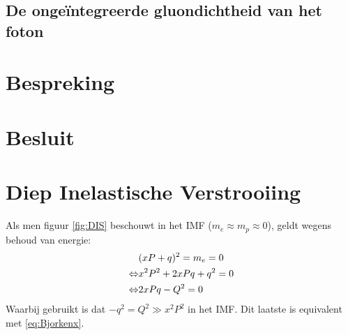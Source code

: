 \documentclass[a4paper,11pt]{article}
\numberwithin{equation}{section} %
\begin{document}
  \subsection{De ongeïntegreerde gluondichtheid van het foton} \label{sec:ResUGD}


\section{Bespreking}

\section{Besluit}

\newpage
\appendix
\section{Diep Inelastische Verstrooiing} \label{app:DIS}
Als men figuur \ref{fig:DIS} beschouwt in het IMF ($m_e \approx m_p \approx 0$), geldt wegens behoud van energie:
\begin{align}
&(xP+q)^2 = m_e = 0 \notag \\
\Leftrightarrow &x^2 P^2 + 2xPq + q^2 = 0 \notag \\
\Leftrightarrow &2xPq -Q^2=0
\end{align}
Waarbij gebruikt is dat $-q^2 = Q^2 \gg x^2P^2$ in het  IMF. Dit laatste is equivalent met \eqref{eq:Bjorkenx}.
\end{document}
